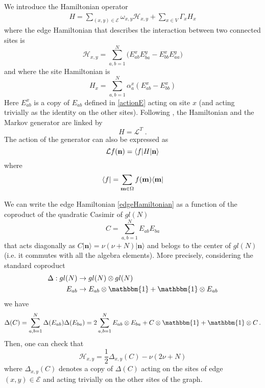 \documentclass[10pt]{article}
\numberwithin{equation}{section}
\numberwithin{equation}{subsection}
\newcommand{\dt}{\;.}
\newcommand{\twoj}{\nu}
\begin{document}
We introduce the Hamiltonian operator
\begin{equation}\label{OriginalHamiltonian}
	\begin{split}
		H=\sum_{(x,y)\in \mathcal{E}}\omega_{x,y}\mathcal{H}_{x,y}+\sum_{x\in V}\Gamma_{x}H_{x}
	\end{split}
\end{equation}
where the edge Hamiltonian that describes the interaction between two connected sites is
\begin{equation}\label{edgeHamiltonian}
\mathcal{H}_{x,y}=\sum_{a,b=1}^{N}\Big(E_{ab}^{x} E_{b a}^{y}-E_{bb}^{x} E_{aa}^{y}\Big)
 \end{equation}
  and where the site Hamiltonian is
 \begin{equation}\label{siteHamiltonian}
H_{x}=\sum_{a,b=1}^{N}\alpha_{a}^{x}\left(E_{ab}^{x}-E_{bb}^{x}\right)
\end{equation}
Here $E_{ab}^{x}$ is a copy of $E_{ab}$ defined in \eqref{actionE} acting on site $x$ (and
acting trivially as the identity on the other sites). 
Following  \cite{belitsky2015self}, the Hamiltonian and the Markov generator are linked by
\begin{equation}\label{Hamiltonian-Generator}
H=\mathcal{L}^{T}\dt
\end{equation}
The action of the generator can also be expressed as 
\begin{equation}
    \mathcal{L}f( {\bf n})=\langle f|H| {\bf n}\rangle
\end{equation}
where 
\begin{equation}
    \langle f|=\sum_{ {{\bf m}\in \Omega}}f( {\bf m})\langle  {\bf m}|
\end{equation}

We can write the edge Hamiltonian \eqref{edgeHamiltonian} as a function of the coproduct of the {\color{red} quadratic} Casimir of $gl(N)$
\begin{equation}\label{secondCasimir}
    C=\sum_{a,b=1}^{N}E_{ab}E_{ba}
\end{equation}
that acts diagonally as $C|\bm{n}\rangle=\twoj(\twoj+N)|\bm{n}\rangle$ and belogs to the center of $gl(N)$ (i.e. it commutes with all the algebra elements).  
More precisely,  considering the standard coproduct 
\begin{equation}
\begin{split}
\Delta:gl(N)&\to gl(N)\otimes gl(N)\\
E_{ab}&\to E_{ab}\otimes \mathbbm{1}+\mathbbm{1}\otimes E_{ab}
\end{split}
\end{equation}
we have 
\begin{equation}
\Delta(C)=\sum_{a,b=1}^{N}\Delta(E_{ab})\Delta(E_{ba})=2\sum_{a,b=1}^{N}E_{ab}\otimes E_{ba}+C\otimes \mathbbm{1}+\mathbbm{1}\otimes C\,.
\end{equation}
Then, one can check that 
\begin{equation}\label{hamiltonianCasimir}
	\mathcal{H}_{x,y}=\frac{1}{2}\Delta_{x,y}(C)-\twoj(2\twoj+N)
\end{equation}
where $\Delta_{x,y}(C)$ denotes a copy of $\Delta(C)$ acting on  the sites of edge $(x,y)\in \mathcal{E}$ and acting trivially on the other sites of the graph.
\end{document}
